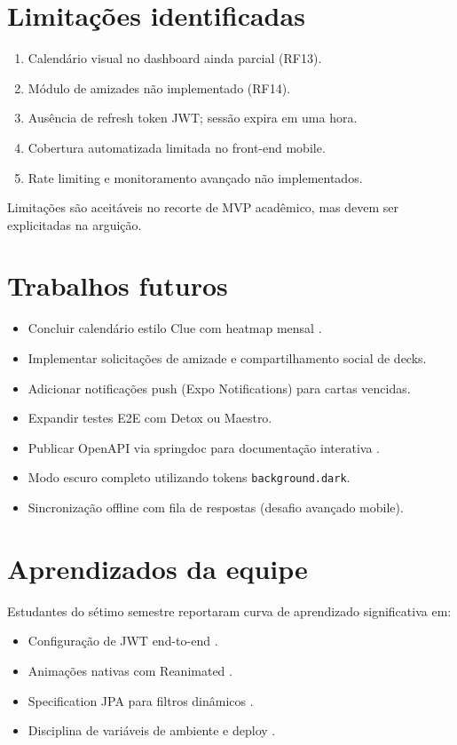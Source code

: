 \section{Limitações identificadas}

\begin{enumerate}
    \item Calendário visual no dashboard ainda parcial (RF13).
    \item Módulo de amizades não implementado (RF14).
    \item Ausência de refresh token JWT; sessão expira em uma hora.
    \item Cobertura automatizada limitada no front-end mobile.
    \item Rate limiting e monitoramento avançado não implementados.
\end{enumerate}

Limitações são aceitáveis no recorte de MVP acadêmico, mas devem ser explicitadas na arguição.

\section{Trabalhos futuros}

\begin{itemize}
    \item Concluir calendário estilo Clue com heatmap mensal \cite{clue_app}.
    \item Implementar solicitações de amizade e compartilhamento social de decks.
    \item Adicionar notificações push (Expo Notifications) para cartas vencidas.
    \item Expandir testes E2E com Detox ou Maestro.
    \item Publicar OpenAPI via springdoc para documentação interativa \cite{openapi_springdoc}.
    \item Modo escuro completo utilizando tokens \texttt{background.dark}.
    \item Sincronização offline com fila de respostas (desafio avançado mobile).
\end{itemize}

\section{Aprendizados da equipe}

Estudantes do sétimo semestre reportaram curva de aprendizado significativa em:
\begin{itemize}
    \item Configuração de JWT end-to-end \cite{youtube_jwt_explained,stackoverflow_jwt_spring}.
    \item Animações nativas com Reanimated \cite{reanimated_docs,youtube_expo_typescript}.
    \item Specification JPA para filtros dinâmicos \cite{jpa_specification}.
    \item Disciplina de variáveis de ambiente e deploy \cite{twelve_factor,railway_docs}.
\end{itemize}

